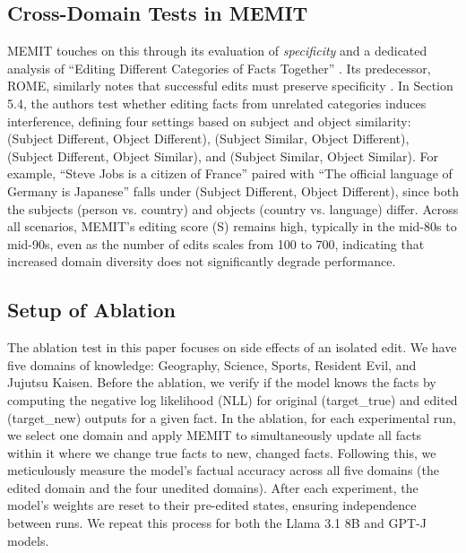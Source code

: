\documentclass[11pt]{article}
\begin{document}
\subsection{Cross-Domain Tests in MEMIT}
\noindent MEMIT touches on this through its evaluation of \textit{specificity} and a dedicated analysis of ``Editing Different Categories of Facts Together'' \cite{meng2023masseditingmemorytransformer}. Its predecessor, ROME, similarly notes that successful edits must preserve specificity \cite{meng2023locatingeditingfactualassociations}. In Section 5.4, the authors test whether editing facts from unrelated categories induces interference, defining four settings based on subject and object similarity: (Subject Different, Object Different), (Subject Similar, Object Different), (Subject Different, Object Similar), and (Subject Similar, Object Similar). For example, ``Steve Jobs is a citizen of France'' paired with ``The official language of Germany is Japanese'' falls under (Subject Different, Object Different), since both the subjects (person vs. country) and objects (country vs. language) differ. Across all scenarios, MEMIT's editing score (S) remains high, typically in the mid-80s to mid-90s, even as the number of edits scales from 100 to 700, indicating that increased domain diversity does not significantly degrade performance.

\subsection{Setup of Ablation}
\noindent The ablation test in this paper focuses on side effects of an isolated edit. We have five domains of knowledge: Geography, Science, Sports, Resident Evil, and Jujutsu Kaisen. Before the ablation, we verify if the model knows the facts by computing the negative log likelihood (NLL) for original (target\_true) and edited (target\_new) outputs for a given fact. In the ablation, for each experimental run, we select one domain and apply MEMIT to simultaneously update all facts within it where we change true facts to new, changed facts. Following this, we meticulously measure the model's factual accuracy across all five domains (the edited domain and the four unedited domains). After each experiment, the model's weights are reset to their pre-edited states, ensuring independence between runs. We repeat this process for both the Llama 3.1 8B and GPT-J models.
\end{document}
